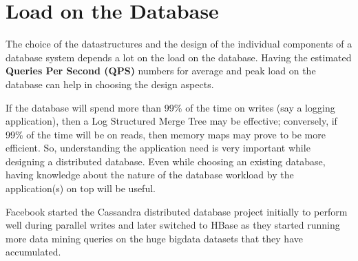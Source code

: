 \section{Load on the Database}

The choice of the datastructures and the design of the individual components of a database system depends a lot on the load on the database. Having the estimated \textbf{Queries Per Second (QPS)} numbers for average and peak load on the database can help in choosing the design aspects.

If the database will spend more than 99\% of the time on writes (say a logging application), then a Log Structured Merge Tree \cite{O_Neil_1996} may be effective; conversely, if 99\% of the time will be on reads, then memory maps may prove to be more efficient. So, understanding the application need is very important while designing a distributed database. Even while choosing an existing database, having knowledge about the nature of the database workload by the application(s) on top will be useful.

Facebook started the Cassandra\cite{Lakshman_2009} distributed database project initially to perform well during parallel writes and later switched to HBase as they started running more data mining queries on the huge bigdata datasets that they have accumulated.